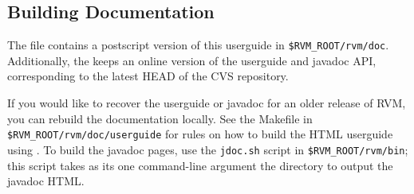 \subsection{Building Documentation}

The {\tt \RVMTarFile} file contains a postscript version of this userguide
in {\tt \$RVM\_ROOT/rvm/doc}.  Additionally, the 
 keeps an online version of
the userguide and javadoc API, corresponding to the latest HEAD of the CVS
repository.

If you would like to recover the userguide or javadoc for an older release
of RVM, you can rebuild the documentation locally.  See the Makefile in
{\tt \$RVM\_ROOT/rvm/doc/userguide} for rules on how to build the
HTML userguide using
.  To build the javadoc pages, use
the {\tt jdoc.sh} script in {\tt \$RVM\_ROOT/rvm/bin}; this script takes as
its one command-line argument the directory to output the javadoc HTML.


